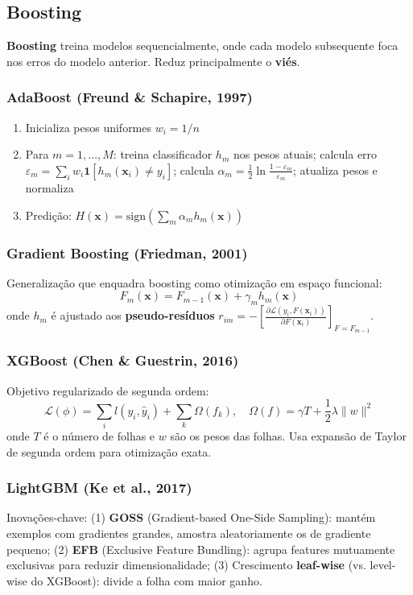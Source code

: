 \documentclass[12pt,a4paper]{article}
\begin{document}
\subsection{Boosting}

\textbf{Boosting} treina modelos sequencialmente, onde cada modelo subsequente foca nos erros do modelo anterior. Reduz principalmente o \textbf{viés}.

\subsubsection{AdaBoost (Freund \& Schapire, 1997)}
\begin{enumerate}
  \item Inicializa pesos uniformes $w_i = 1/n$
  \item Para $m = 1,\ldots,M$: treina classificador $h_m$ nos pesos atuais; calcula erro $\varepsilon_m = \sum_i w_i \mathbf{1}[h_m(\mathbf{x}_i) \neq y_i]$; calcula $\alpha_m = \frac{1}{2}\ln\frac{1-\varepsilon_m}{\varepsilon_m}$; atualiza pesos e normaliza
  \item Predição: $H(\mathbf{x}) = \text{sign}\left(\sum_m \alpha_m h_m(\mathbf{x})\right)$
\end{enumerate}

\subsubsection{Gradient Boosting (Friedman, 2001)}
Generalização que enquadra boosting como otimização em espaço funcional:
\[
  F_m(\mathbf{x}) = F_{m-1}(\mathbf{x}) + \gamma_m h_m(\mathbf{x})
\]
onde $h_m$ é ajustado aos \textbf{pseudo-resíduos} $r_{im} = -\left[\frac{\partial \mathcal{L}(y_i, F(\mathbf{x}_i))}{\partial F(\mathbf{x}_i)}\right]_{F=F_{m-1}}$.

\subsubsection{XGBoost (Chen \& Guestrin, 2016)}
Objetivo regularizado de segunda ordem:
\[
  \mathcal{L}(\phi) = \sum_i l(y_i, \hat{y}_i) + \sum_k \Omega(f_k), \quad \Omega(f) = \gamma T + \frac{1}{2}\lambda\|w\|^2
\]
onde $T$ é o número de folhas e $w$ são os pesos das folhas. Usa expansão de Taylor de segunda ordem para otimização exata.

\subsubsection{LightGBM (Ke et al., 2017)}
Inovações-chave: (1) \textbf{GOSS} (Gradient-based One-Side Sampling): mantém exemplos com gradientes grandes, amostra aleatoriamente os de gradiente pequeno; (2) \textbf{EFB} (Exclusive Feature Bundling): agrupa features mutuamente exclusivas para reduzir dimensionalidade; (3) Crescimento \textbf{leaf-wise} (vs. level-wise do XGBoost): divide a folha com maior ganho.
\end{document}
